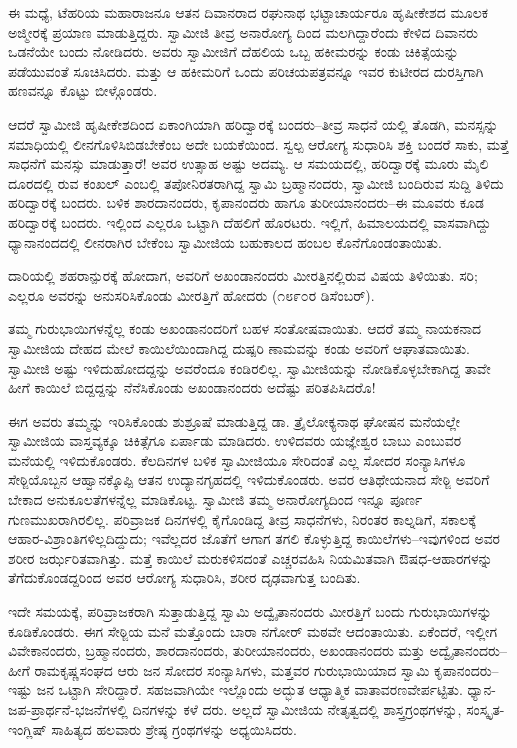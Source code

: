 ಈ ಮಧ್ಯೆ, ಟೆಹರಿಯ ಮಹಾರಾಜನೂ ಆತನ ದಿವಾನರಾದ ರಘುನಾಥ ಭಟ್ಟಾಚಾರ್ಯರೂ ಹೃಷೀಕೇಶದ ಮೂಲಕ ಅಜ್ಮೀರಕ್ಕೆ ಪ್ರಯಾಣ ಮಾಡುತ್ತಿದ್ದರು. ಸ್ವಾಮೀಜಿ ತೀವ್ರ ಅನಾರೋಗ್ಯ ದಿಂದ ಮಲಗಿದ್ದಾರೆಂದು ಕೇಳಿದ ದಿವಾನರು ಒಡನೆಯೇ ಬಂದು ನೋಡಿದರು. ಅವರು ಸ್ವಾಮೀಜಿಗೆ ದೆಹಲಿಯ ಒಬ್ಬ ಹಕೀಮರನ್ನು ಕಂಡು ಚಿಕಿತ್ಸೆಯನ್ನು ಪಡೆಯುವಂತೆ ಸೂಚಿಸಿದರು. ಮತ್ತು ಆ ಹಕೀಮರಿಗೆ ಒಂದು ಪರಿಚಯಪತ್ರವನ್ನೂ ಇವರ ಕುಟೀರದ ದುರಸ್ತಿಗಾಗಿ ಹಣವನ್ನೂ ಕೊಟ್ಟು ಬೀಳ್ಗೊಂಡರು.

ಆದರೆ ಸ್ವಾಮೀಜಿ ಹೃಷೀಕೇಶದಿಂದ ಏಕಾಂಗಿಯಾಗಿ ಹರಿದ್ವಾರಕ್ಕೆ ಬಂದರು–ತೀವ್ರ ಸಾಧನೆ ಯಲ್ಲಿ ತೊಡಗಿ, ಮನಸ್ಸನ್ನು ಸಮಾಧಿಯಲ್ಲಿ ಲೀನಗೊಳಿಸಿಬಿಡಬೇಕೆಂಬ ಅದೇ ಬಯಕೆಯಿಂದ. ಸ್ವಲ್ಪ ಆರೋಗ್ಯ ಸುಧಾರಿಸಿ ಶಕ್ತಿ ಬಂದರೆ ಸಾಕು, ಮತ್ತೆ ಸಾಧನೆಗೆ ಮನಸ್ಸು ಮಾಡುತ್ತಾರೆ! ಅವರ ಉತ್ಸಾಹ ಅಷ್ಟು ಅದಮ್ಯ. ಆ ಸಮಯದಲ್ಲಿ, ಹರಿದ್ವಾರಕ್ಕೆ ಮೂರು ಮೈಲಿ ದೂರದಲ್ಲಿ ರುವ ಕಂಖಲ್ ಎಂಬಲ್ಲಿ ತಪೋನಿರತರಾಗಿದ್ದ ಸ್ವಾಮಿ ಬ್ರಹ್ಮಾನಂದರು, ಸ್ವಾಮೀಜಿ ಬಂದಿರುವ ಸುದ್ದಿ ತಿಳಿದು ಹರಿದ್ವಾರಕ್ಕೆ ಬಂದರು. ಬಳಿಕ ಶಾರದಾನಂದರು, ಕೃಪಾನಂದರು ಹಾಗೂ ತುರೀಯಾನಂದರು–ಈ ಮೂವರು ಕೂಡ ಹರಿದ್ವಾರಕ್ಕೆ ಬಂದರು. ಇಲ್ಲಿಂದ ಎಲ್ಲರೂ ಒಟ್ಟಾಗಿ ದೆಹಲಿಗೆ ಹೊರಟರು. ಇಲ್ಲಿಗೆ, ಹಿಮಾಲಯದಲ್ಲಿ ವಾಸವಾಗಿದ್ದು ಧ್ಯಾನಾನಂದದಲ್ಲಿ ಲೀನರಾಗಿರ ಬೇಕೆಂಬ ಸ್ವಾಮೀಜಿಯ ಬಹುಕಾಲದ ಹಂಬಲ ಕೊನೆಗೊಂಡಂತಾಯಿತು.

ದಾರಿಯಲ್ಲಿ ಶಹರಾನ್ಪುರಕ್ಕೆ ಹೋದಾಗ, ಅವರಿಗೆ ಅಖಂಡಾನಂದರು ಮೀರತ್ತಿನಲ್ಲಿರುವ ವಿಷಯ ತಿಳಿಯಿತು. ಸರಿ; ಎಲ್ಲರೂ ಅವರನ್ನು ಅನುಸರಿಸಿಕೊಂಡು ಮೀರತ್ತಿಗೆ ಹೋದರು (೧೮೯೦ರ ಡಿಸೆಂಬರ್).

ತಮ್ಮ ಗುರುಭಾಯಿಗಳನ್ನೆಲ್ಲ ಕಂಡು ಅಖಂಡಾನಂದರಿಗೆ ಬಹಳ ಸಂತೋಷವಾಯಿತು. ಆದರೆ ತಮ್ಮ ನಾಯಕನಾದ ಸ್ವಾಮೀಜಿಯ ದೇಹದ ಮೇಲೆ ಕಾಯಿಲೆಯಿಂದಾಗಿದ್ದ ದುಷ್ಪರಿ ಣಾಮವನ್ನು ಕಂಡು ಅವರಿಗೆ ಆಘಾತವಾಯಿತು. ಸ್ವಾಮೀಜಿ ಅಷ್ಟು ಇಳಿದುಹೋದದ್ದನ್ನು ಅವರೆಂದೂ ಕಂಡಿರಲಿಲ್ಲ. ಸ್ವಾಮೀಜಿಯನ್ನು ನೋಡಿಕೊಳ್ಳಬೇಕಾಗಿದ್ದ ತಾವೇ ಹೀಗೆ ಕಾಯಿಲೆ ಬಿದ್ದದ್ದನ್ನು ನೆನೆಸಿಕೊಂಡು ಅಖಂಡಾನಂದರು ಅದೆಷ್ಟು ಪರಿತಪಿಸಿದರೊ!

ಈಗ ಅವರು ತಮ್ಮನ್ನು ಇರಿಸಿಕೊಂಡು ಶುಶ್ರೂಷೆ ಮಾಡುತ್ತಿದ್ದ ಡಾ. ತ್ರೈಲೋಕ್ಯನಾಥ ಘೋಷನ ಮನೆಯಲ್ಲೇ ಸ್ವಾಮೀಜಿಯ ವಾಸ್ತವ್ಯಕ್ಕೂ ಚಿಕಿತ್ಸೆಗೂ ಏರ್ಪಾಡು ಮಾಡಿದರು. ಉಳಿದವರು ಯಜ್ಞೇಶ್ವರ ಬಾಬು ಎಂಬುವರ ಮನೆಯಲ್ಲಿ ಇಳಿದುಕೊಂಡರು. ಕೆಲದಿನಗಳ ಬಳಿಕ ಸ್ವಾಮೀಜಿಯೂ ಸೇರಿದಂತೆ ಎಲ್ಲ ಸೋದರ ಸಂನ್ಯಾಸಿಗಳೂ ಸೇಠ್ಜಿಯೊಬ್ಬನ ಆಹ್ವಾನಕ್ಕೊಪ್ಪಿ ಆತನ ಉದ್ಯಾನಗೃಹದಲ್ಲಿ ಇಳಿದುಕೊಂಡರು. ಅವರ ಆತಿಥೇಯನಾದ ಸೇಠ್ಜಿ ಅವರಿಗೆ ಬೇಕಾದ ಅನುಕೂಲತೆಗಳನ್ನೆಲ್ಲ ಮಾಡಿಕೊಟ್ಟ. ಸ್ವಾಮೀಜಿ ತಮ್ಮ ಅನಾರೋಗ್ಯದಿಂದ ಇನ್ನೂ ಪೂರ್ಣ ಗುಣಮುಖರಾಗಿರಲಿಲ್ಲ. ಪರಿವ್ರಾಜಕ ದಿನಗಳಲ್ಲಿ ಕೈಗೊಂಡಿದ್ದ ತೀವ್ರ ಸಾಧನೆಗಳು, ನಿರಂತರ ಕಾಲ್ನಡಿಗೆ, ಸಕಾಲಕ್ಕೆ ಆಹಾರ-ವಿಶ್ರಾಂತಿಗಳಿಲ್ಲದಿದ್ದುದು; ಇವೆಲ್ಲದರ ಜೊತೆಗೆ ಆಗಾಗ ತಗಲಿ ಕೊಳ್ಳುತ್ತಿದ್ದ ಕಾಯಿಲೆಗಳು–ಇವುಗಳಿಂದ ಅವರ ಶರೀರ ಜರ್ಝರಿತವಾಗಿತ್ತು. ಮತ್ತೆ ಕಾಯಿಲೆ ಮರುಕಳಿಸದಂತೆ ಎಚ್ಚರವಹಿಸಿ ನಿಯಮಿತವಾಗಿ ಔಷಧ-ಆಹಾರಗಳನ್ನು ತೆಗೆದುಕೊಂಡದ್ದರಿಂದ ಅವರ ಆರೋಗ್ಯ ಸುಧಾರಿಸಿ, ಶರೀರ ದೃಢವಾಗುತ್ತ ಬಂದಿತು.

ಇದೇ ಸಮಯಕ್ಕೆ, ಪರಿವ್ರಾಜಕರಾಗಿ ಸುತ್ತಾಡುತ್ತಿದ್ದ ಸ್ವಾಮಿ ಅದ್ವೈತಾನಂದರು ಮೀರತ್ತಿಗೆ ಬಂದು ಗುರುಭಾಯಿಗಳನ್ನು ಕೂಡಿಕೊಂಡರು. ಈಗ ಸೇಠ್ಜಿಯ ಮನೆ ಮತ್ತೊಂದು ಬಾರಾ ನಗೋರ್ ಮಠವೇ ಆದಂತಾಯಿತು. ಏಕೆಂದರೆ, ಇಲ್ಲೀಗ ವಿವೇಕಾನಂದರು, ಬ್ರಹ್ಮಾನಂದರು, ಶಾರದಾನಂದರು, ತುರೀಯಾನಂದರು, ಅಖಂಡಾನಂದರು ಮತ್ತು ಅದ್ವೈತಾನಂದರು–ಹೀಗೆ ರಾಮಕೃಷ್ಣಸಂಘದ ಆರು ಜನ ಸೋದರ ಸಂನ್ಯಾಸಿಗಳು, ಮತ್ತವರ ಗುರುಭಾಯಿಯಾದ ಸ್ವಾಮಿ ಕೃಪಾನಂದರು–ಇಷ್ಟು ಜನ ಒಟ್ಟಾಗಿ ಸೇರಿದ್ದಾರೆ. ಸಹಜವಾಗಿಯೇ ಇಲ್ಲೊಂದು ಅದ್ಭುತ ಆಧ್ಯಾತ್ಮಿಕ ವಾತಾವರಣವೇರ್ಪಟ್ಟಿತು. ಧ್ಯಾನ-ಜಪ-ಪ್ರಾರ್ಥನೆ-ಭಜನೆಗಳಲ್ಲಿ ದಿನಗಳನ್ನು ಕಳೆ ದರು. ಅಲ್ಲದೆ ಸ್ವಾಮೀಜಿಯ ನೇತೃತ್ವದಲ್ಲಿ ಶಾಸ್ತ್ರಗ್ರಂಥಗಳನ್ನು, ಸಂಸ್ಕೃತ-ಇಂಗ್ಲಿಷ್ ಸಾಹಿತ್ಯದ ಹಲವಾರು ಶ್ರೇಷ್ಠ ಗ್ರಂಥಗಳನ್ನು ಅಧ್ಯಯಿಸಿದರು.


